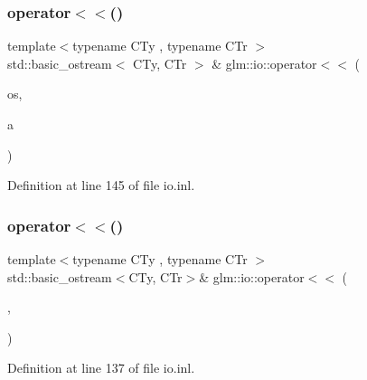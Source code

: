 \subsubsection{\texorpdfstring{operator$<$$<$()}{operator<<()}\hspace{0.1cm}{\footnotesize\ttfamily [5/7]}}
{\footnotesize\ttfamily template$<$typename C\+Ty , typename C\+Tr $>$ \\
std\+::basic\+\_\+ostream$<$ C\+Ty, C\+Tr $>$ \& glm\+::io\+::operator$<$$<$ (\begin{DoxyParamCaption}\item[{std\+::basic\+\_\+ostream$<$ C\+Ty, C\+Tr $>$ \&}]{os,  }\item[{\hyperlink{structglm_1_1io_1_1delimeter}{delimeter}$<$ C\+Ty $>$ const \&}]{a }\end{DoxyParamCaption})}



Definition at line 145 of file io.\+inl.

\mbox{\label{namespaceglm_1_1io_a61e151e99a1d05cb604f0bede66996be}} 
\subsubsection{\texorpdfstring{operator$<$$<$()}{operator<<()}\hspace{0.1cm}{\footnotesize\ttfamily [6/7]}}
{\footnotesize\ttfamily template$<$typename C\+Ty , typename C\+Tr $>$ \\
std\+::basic\+\_\+ostream$<$C\+Ty, C\+Tr$>$\& glm\+::io\+::operator$<$$<$ (\begin{DoxyParamCaption}\item[{std\+::basic\+\_\+ostream$<$ C\+Ty, C\+Tr $>$ \&}]{,  }\item[{\hyperlink{structglm_1_1io_1_1width}{width} const \&}]{ }\end{DoxyParamCaption})}



Definition at line 137 of file io.\+inl.

\mbox{\label{namespaceglm_1_1io_a72020640c68a8c4e010b7d3f02a0ca92}} 
